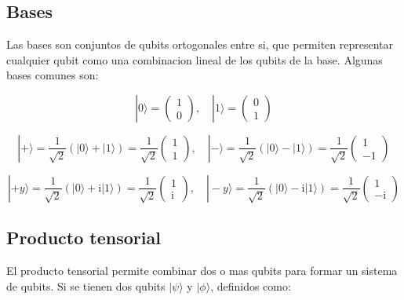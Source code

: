 \documentclass[11pt]{article}
\newcommand{\ii}{\mathrm{i}}
\begin{document}
\subsection{Bases}

Las bases son conjuntos de qubits ortogonales entre si, que permiten representar cualquier qubit como una combinacion lineal de los qubits de la base. Algunas bases comunes son:

\begin{equation}
    |0\rangle = \begin{pmatrix} 1 \\ 0 \end{pmatrix}, \quad |1\rangle = \begin{pmatrix} 0 \\ 1 \end{pmatrix}
\end{equation}

\begin{equation}
    |+\rangle = \frac{1}{\sqrt{2}} (|0\rangle + |1\rangle) = \frac{1}{\sqrt{2}} \begin{pmatrix} 1 \\ 1 \end{pmatrix}, \quad |-\rangle = \frac{1}{\sqrt{2}} (|0\rangle - |1\rangle) = \frac{1}{\sqrt{2}} \begin{pmatrix} 1 \\ -1 \end{pmatrix}
\end{equation}

\begin{equation}
    |+y\rangle = \frac{1}{\sqrt{2}} (|0\rangle + \ii |1\rangle) = \frac{1}{\sqrt{2}} \begin{pmatrix} 1 \\ \ii \end{pmatrix}, \quad |-y\rangle = \frac{1}{\sqrt{2}} (|0\rangle - \ii |1\rangle) = \frac{1}{\sqrt{2}} \begin{pmatrix} 1 \\ -\ii \end{pmatrix}
\end{equation}

\subsection{Producto tensorial}

El producto tensorial permite combinar dos o mas qubits para formar un sistema de qubits. Si se tienen dos qubits $|\psi\rangle$ y $|\phi\rangle$, definidos como:
\end{document}
